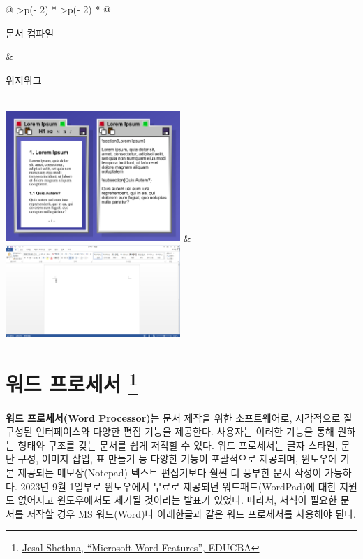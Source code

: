 \documentclass[
  letterpaper,
]{book}
\begin{document}
\begin{longtable}[]{@{}
  >{\centering\arraybackslash}p{(\columnwidth - 2\tabcolsep) * }
  >{\centering\arraybackslash}p{(\columnwidth - 2\tabcolsep) * }@{}}
\toprule\noalign{}
\begin{minipage}[b]{\linewidth}\centering
문서 컴파일
\end{minipage} & \begin{minipage}[b]{\linewidth}\centering
위지위그
\end{minipage} \\
\midrule\noalign{}
\endhead
\bottomrule\noalign{}
\endlastfoot
\includegraphics[width=2.60417in,height=\textheight]{images/wyswig-wikipedia.png}
&
\includegraphics[width=2.60417in,height=\textheight]{images/wyswyg-word.png} \\
\end{longtable}

\hypertarget{main-features}{%
\section[워드 프로세서 ]{\texorpdfstring{워드 프로세서
\footnote{\href{https://www.educba.com/microsoft-word-features/}{Jesal
  Shethna, ``Microsoft Word Features'', EDUCBA}}}{워드 프로세서 }}\label{main-features}}

\textbf{워드 프로세서(Word Processor)}는 문서 제작을 위한 소프트웨어로,
시각적으로 잘 구성된 인터페이스와 다양한 편집 기능을 제공한다. 사용자는
이러한 기능을 통해 원하는 형태와 구조를 갖는 문서를 쉽게 저작할 수 있다.
워드 프로세서는 글자 스타일, 문단 구성, 이미지 삽입, 표 만들기 등 다양한
기능이 포괄적으로 제공되며, 윈도우에 기본 제공되는 메모장(Notepad)
텍스트 편집기보다 훨씬 더 풍부한 문서 작성이 가능하다. 2023년 9월
1일부로 윈도우에서 무료로 제공되던 워드패드(WordPad)에 대한 지원도
없어지고 윈도우에서도 제거될 것이라는 발표가 있었다. 따라서, 서식이
필요한 문서를 저작할 경우 MS 워드(Word)나 아래한글과 같은 워드
프로세서를 사용해야 된다.
\end{document}

